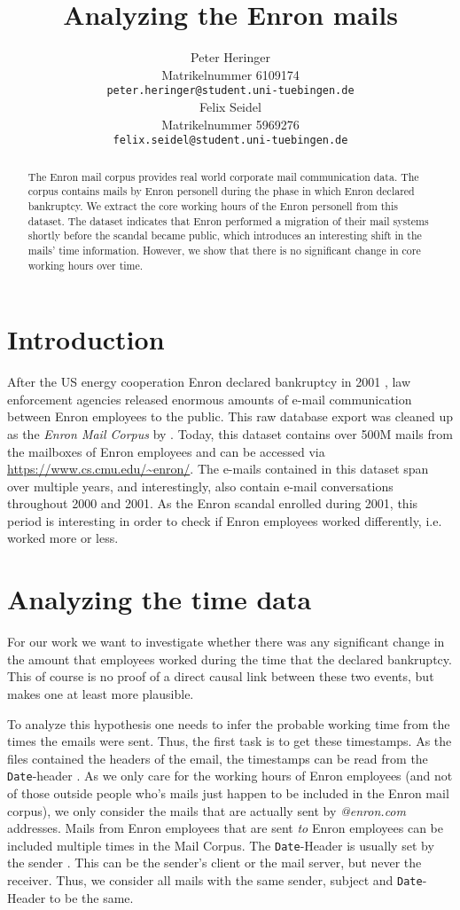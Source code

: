 \documentclass{article}
\title{Analyzing the Enron mails}
\author{%
  Peter Heringer\\
  Matrikelnummer 6109174 \\
  \texttt{peter.heringer@student.uni-tuebingen.de} \\
  \And Felix Seidel\\
  Matrikelnummer 5969276 \\
  \texttt{felix.seidel@student.uni-tuebingen.de} \\
}
\begin{document}
\maketitle

\begin{abstract}
  The Enron mail corpus provides real world corporate mail communication data.
  The corpus contains mails by Enron personell during the phase in which Enron
  declared bankruptcy. We extract the core working hours of the Enron personell
  from this dataset. The dataset indicates that Enron performed a migration of
  their mail systems shortly before the scandal became public, which introduces
  an interesting shift in the mails' time information. However, we show that
  there is no significant change in core working hours over time.
\end{abstract}

\section{Introduction}
After the US energy cooperation Enron declared bankruptcy in 2001
\citep{10.1257/089533003765888403}, law enforcement agencies released enormous
amounts of e-mail communication between Enron employees to the public. This raw
database export was cleaned up as the \emph{Enron Mail Corpus} by
\citet{Klimt2004IntroducingTE}. Today, this dataset contains over 500M mails
from the mailboxes of Enron employees and can be accessed via
\url{https://www.cs.cmu.edu/~enron/}. The e-mails contained in this dataset span
over multiple years, and interestingly, also contain e-mail conversations
throughout 2000 and 2001. As the Enron scandal enrolled during 2001, this period
is interesting in order to check if Enron employees worked differently, i.e.
worked more or less.

\section{Analyzing the time data}
For our work we want to investigate whether there was any significant change in
the amount that employees worked during the time that the declared bankruptcy.
This of course is no proof of a direct causal link between these two events, but
makes one at least more plausible.

To analyze this hypothesis one needs to infer the probable working time from the
times the emails were sent. Thus, the first task is to get these timestamps. As
the files contained the headers of the email, the timestamps can be read from
the \texttt{Date}-header \citep{rfc5322}. As we only care for the working hours
of Enron employees (and not of those outside people who's mails just happen to
be included in the Enron mail corpus), we only consider the mails that are
actually sent by \emph{@enron.com} addresses. Mails from Enron employees that
are sent \emph{to} Enron employees can be included multiple times in the Mail
Corpus. The \texttt{Date}-Header is usually set by the sender \citep{rfc2821}.
This can be the sender's client or the mail server, but never the receiver.
Thus, we consider all mails with the same sender, subject and
\texttt{Date}-Header to be the same.
\end{document}

